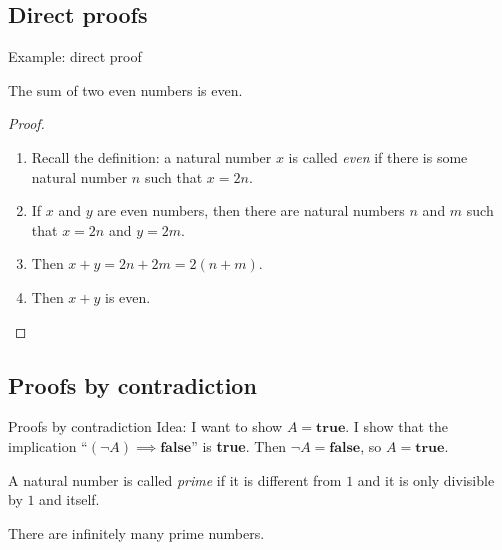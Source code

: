\documentclass[11pt]{beamer}
\theoremstyle{definition}
\begin{document}
\subsection{Direct proofs}
\begin{frame}{Example: direct proof}
  \begin{theorem}
    The sum of two even numbers is even.
  \end{theorem}
  \pause
  \begin{proof}
    \begin{enumerate}
  \item Recall the definition: a natural number $x$ is called \emph{even}
        if there is some natural number $n$ such that $x=2n$.
    \pause
  \item If $x$ and $y$ are even numbers, then there are natural numbers $n$
    and $m$ such that $x=2n$ and $y=2m$.
    \pause
  \item Then $x+y=2n+2m=2(n+m)$.
    \pause
  \item Then $x+y$ is even.
    \end{enumerate} 
  \end{proof}
\end{frame}


\subsection{Proofs by contradiction}

\begin{frame}{Proofs by contradiction}
  Idea: I want to show $A=\textbf{true}$. I show that the implication
  ``$(\neg A)\implies\textbf{false}$'' is \textbf{true}.
  Then $\neg A=\textbf{false}$, so $A=\textbf{true}$.
  \pause
\begin{definition}
  A natural number is called \emph{prime} if it is different from $1$ and it
  is only divisible by $1$ and itself.
\end{definition}
  \begin{theorem}
    There are infinitely many prime numbers.
  \end{theorem}

\end{frame}
\end{document}
